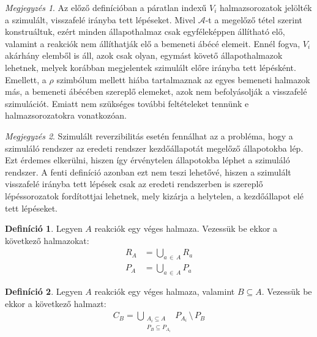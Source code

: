 \documentclass[12pt]{article}
\theoremstyle{definition}
\newtheorem*{definition*}{Definíció}
\theoremstyle{remark}
\newtheorem*{remark*}{Megjegyzés}
\theoremstyle{plain}
\theoremstyle{plain}
\begin{document}
    \begin{remark*}
        Az előző definícióban a páratlan indexű $V_{i}$ halmazsorozatok jelölték a szimulált, visszafelé irányba tett lépéseket. Mivel $\mathscr{A}$-t a megelőző tétel szerint konstruáltuk, ezért minden állapothalmaz csak egyféleképpen állítható elő, valamint a reakciók nem állíthatják elő a bemeneti ábécé elemeit. Ennél fogva, $V_{i}$ akárhány elemből is áll, azok csak olyan, egymást követő állapothalmazok lehetnek, melyek korábban megjelentek szimulált előre irányba tett lépésként. Emellett, a $\rho$ szimbólum mellett hiába tartalmaznak az egyes bemeneti halmazok más, a bemeneti ábécében szereplő elemeket, azok nem befolyásolják a visszafelé szimulációt. Emiatt nem szükséges további feltételeket tennünk e halmazsorozatokra vonatkozóan.
    \end{remark*}

    \begin{remark*}
        Szimulált reverzibilitás esetén fennálhat az a probléma, hogy a szimuláló rendszer az eredeti rendszer kezdőállapotát megelőző állapotokba lép. Ezt érdemes elkerülni, hiszen így érvénytelen állapotokba léphet a szimuláló rendszer. A fenti definíció azonban ezt nem teszi lehetővé, hiszen a szimulált visszafelé irányba tett lépések csak az eredeti rendszerben is szereplő lépéssorozatok fordítottjai lehetnek, mely kizárja a helytelen, a kezdőállapot elé tett lépéseket.
    \end{remark*}

    \begin{definition*}
        Legyen $A$ reakciók egy véges halmaza. Vezessük be ekkor a következő halmazokat:
        \begin{align*}
            R_{A} &= \bigcup\limits_{a \,\in\, A} R_{a} \\
            P_{A} &= \bigcup\limits_{a \,\in\, A} P_{a}
        \end{align*}
    \end{definition*}

    \begin{definition*}
        Legyen $A$ reakciók egy véges halmaza, valamint $B \subseteq A$. Vezessük be ekkor a következő halmazt:
        \begin{align*}
            C_{B} = \bigcup\limits_{\substack{A_{i} \subseteq A \\ P_{B} \subseteq P_{A_{i}}}} P_{A_{i}} \,\setminus\, P_{B}
        \end{align*}
    \end{definition*}
\end{document}
